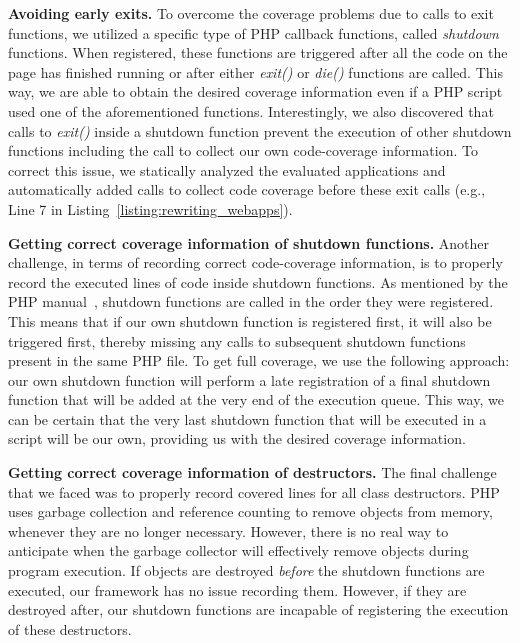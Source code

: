 \vspace{1ex}
\noindent\textbf{Avoiding early exits.}
To overcome the coverage problems due to calls to exit functions, we
utilized a specific type of PHP callback functions, called \textit{shutdown}
functions. When registered, these functions are triggered after all the
code on the page has finished running or after either \textit{exit()} or
\textit{die()} functions are called. This way, we are able to obtain the
desired coverage information even if a PHP script used one of the aforementioned functions.
Interestingly, we also discovered that calls to \textit{exit()} inside a
shutdown function prevent the execution of other shutdown functions
including the call to collect our own code-coverage information. To correct
this issue, we statically analyzed the evaluated applications and automatically
added calls to collect code coverage before these exit calls (e.g., Line 7
in Listing~\ref{listing:rewriting_webapps}).

\vspace{1ex}
\noindent\textbf{Getting correct coverage information of shutdown functions.}
Another challenge, in terms of recording correct code-coverage information,
is to properly record the executed lines of code inside shutdown functions. As
mentioned by the PHP manual~\cite{phpshutdown}, shutdown functions are called
in the order they were registered. This means that if our own shutdown function
is registered first, it will also be triggered first, thereby missing any
calls to subsequent shutdown functions present in the same PHP file. To get
full coverage, we use the following approach: our own shutdown function will
perform a late registration of a final shutdown function that will be added
at the very end of the execution queue. This way, we can be certain that
the very last shutdown function that will be executed in a script will be
our own, providing us with the desired coverage information.


\vspace{1ex}
\noindent\textbf{Getting correct coverage information of destructors.}
The final challenge that we faced was to properly record covered lines for
all class destructors. PHP uses garbage collection and reference counting to
remove objects from memory, whenever they are no longer necessary. However,
there is no real way to anticipate when the garbage collector will effectively
remove objects during program execution. If objects are destroyed \emph{before}
the shutdown functions are executed, our framework has no issue recording
them. However, if they are destroyed after, our shutdown functions are
incapable of registering the execution of these destructors.

